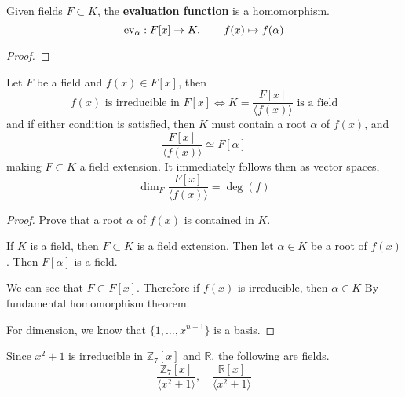   \begin{lemma}
    Given fields $F \subset K$, the \textbf{evaluation function} is a homomorphism. 
    \begin{equation}
      \operatorname{ev}_\alpha: F[x] \rightarrow K, \qquad f(x) \mapsto f(\alpha)
    \end{equation}
  \end{lemma}
  \begin{proof}
    
  \end{proof} 

  \begin{theorem}
    Let $F$ be a field and $f(x) \in F[x]$, then 
    \begin{equation}
      f(x) \text{ is irreducible in } F[x] \iff K = \frac{F[x]}{\langle f(x) \rangle} \text{ is a field}
    \end{equation} 
    and if either condition is satisfied, then $K$ must contain  a root $\alpha$ of $f(x)$, and 
    \begin{equation}
      \frac{F[x]}{\langle f(x) \rangle} \simeq F[\alpha]
    \end{equation}
    making $F \subset K$ a field extension. It immediately follows then as vector spaces, 
    \begin{equation}
      \dim_F \frac{F[x]}{\langle f(x) \rangle} = \deg(f)
    \end{equation}
  \end{theorem}
  \begin{proof} 
    Prove that a root $\alpha$ of $f(x)$ is contained in $K$. 

    If $K$ is a field, then $F \subset K$ is a field extension. Then let $\alpha \in K$ be a root of $f(x)$. Then $F[\alpha]$ is a field.  

    We can see that $F \subset F[x]$. Therefore if $f(x)$ is irreducible, then $\alpha \in K$
    By fundamental homomorphism theorem. 

    For dimension, we know that $\{1, \ldots, x^{n-1}\}$ is a basis. 
  \end{proof}

  \begin{example}
    Since $x^2 + 1$ is irreducible in $\mathbb{Z}_7 [x]$ and $\mathbb{R}$, the following are fields. 
    \begin{equation}
      \frac{\mathbb{Z}_7 [x]}{\langle x^2 + 1 \rangle}, \quad \frac{\mathbb{R}[x]}{\langle x^2 + 1 \rangle}
    \end{equation}
  \end{example}

